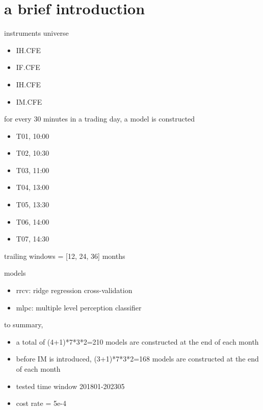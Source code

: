 \section{a brief introduction}

instruments universe

\begin{itemize}
    \item IH.CFE
    \item IF.CFE
    \item IH.CFE
    \item IM.CFE
\end{itemize}


for every 30 minutes in a trading day, a model is constructed

\begin{itemize}
    \item T01, 10:00
    \item T02, 10:30
    \item T03, 11:00
    \item T04, 13:00
    \item T05, 13:30
    \item T06, 14:00
    \item T07, 14:30
\end{itemize}


trailing windows = [12, 24, 36] months

models

\begin{itemize}
    \item rrcv: ridge regression cross-validation
    \item mlpc: multiple level perception classifier
\end{itemize}

to summary,

\begin{itemize}
    \item a total of (4+1)*7*3*2=210 models are constructed at the end of each month
    \item before IM is introduced, (3+1)*7*3*2=168 models are constructed at the end of each month
    \item tested time window 201801-202305
    \item cost rate = 5e-4
\end{itemize}



